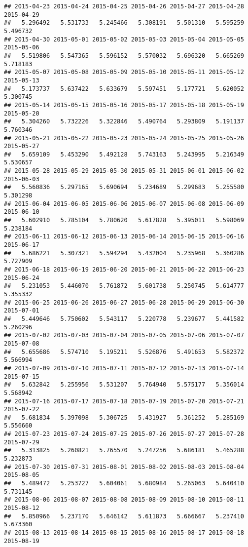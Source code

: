 \documentclass[
]{article}
\begin{document}
\begin{verbatim}
## 2015-04-23 2015-04-24 2015-04-25 2015-04-26 2015-04-27 2015-04-28 2015-04-29 
##   5.296492   5.531733   5.245466   5.308191   5.501310   5.595259   5.496732 
## 2015-04-30 2015-05-01 2015-05-02 2015-05-03 2015-05-04 2015-05-05 2015-05-06 
##   5.519806   5.547365   5.596152   5.570032   5.696320   5.665269   5.718183 
## 2015-05-07 2015-05-08 2015-05-09 2015-05-10 2015-05-11 2015-05-12 2015-05-13 
##   5.173737   5.637422   5.633679   5.597451   5.177721   5.620052   5.300745 
## 2015-05-14 2015-05-15 2015-05-16 2015-05-17 2015-05-18 2015-05-19 2015-05-20 
##   5.304260   5.732226   5.322846   5.490764   5.293809   5.191137   5.760346 
## 2015-05-21 2015-05-22 2015-05-23 2015-05-24 2015-05-25 2015-05-26 2015-05-27 
##   5.659109   5.453290   5.492128   5.743163   5.243995   5.216349   5.530657 
## 2015-05-28 2015-05-29 2015-05-30 2015-05-31 2015-06-01 2015-06-02 2015-06-03 
##   5.560836   5.297165   5.690694   5.234689   5.299683   5.255580   5.301298 
## 2015-06-04 2015-06-05 2015-06-06 2015-06-07 2015-06-08 2015-06-09 2015-06-10 
##   5.602910   5.785104   5.780620   5.617828   5.395011   5.598069   5.238184 
## 2015-06-11 2015-06-12 2015-06-13 2015-06-14 2015-06-15 2015-06-16 2015-06-17 
##   5.686221   5.307321   5.594294   5.432004   5.235968   5.360286   5.727909 
## 2015-06-18 2015-06-19 2015-06-20 2015-06-21 2015-06-22 2015-06-23 2015-06-24 
##   5.231053   5.446070   5.761872   5.601738   5.250745   5.614777   5.355332 
## 2015-06-25 2015-06-26 2015-06-27 2015-06-28 2015-06-29 2015-06-30 2015-07-01 
##   5.449646   5.750602   5.543117   5.220778   5.239677   5.441582   5.260296 
## 2015-07-02 2015-07-03 2015-07-04 2015-07-05 2015-07-06 2015-07-07 2015-07-08 
##   5.655686   5.574710   5.195211   5.526876   5.491653   5.582372   5.566994 
## 2015-07-09 2015-07-10 2015-07-11 2015-07-12 2015-07-13 2015-07-14 2015-07-15 
##   5.632842   5.255956   5.531207   5.764940   5.575177   5.356014   5.568942 
## 2015-07-16 2015-07-17 2015-07-18 2015-07-19 2015-07-20 2015-07-21 2015-07-22 
##   5.681834   5.397098   5.306725   5.431927   5.361252   5.285169   5.556660 
## 2015-07-23 2015-07-24 2015-07-25 2015-07-26 2015-07-27 2015-07-28 2015-07-29 
##   5.313825   5.260821   5.765570   5.247256   5.686181   5.465288   5.232873 
## 2015-07-30 2015-07-31 2015-08-01 2015-08-02 2015-08-03 2015-08-04 2015-08-05 
##   5.489472   5.253727   5.604061   5.680984   5.265063   5.640410   5.731145 
## 2015-08-06 2015-08-07 2015-08-08 2015-08-09 2015-08-10 2015-08-11 2015-08-12 
##   5.850966   5.237170   5.646142   5.611873   5.666667   5.237410   5.673360 
## 2015-08-13 2015-08-14 2015-08-15 2015-08-16 2015-08-17 2015-08-18 2015-08-19 

\end{verbatim}
\end{document}
